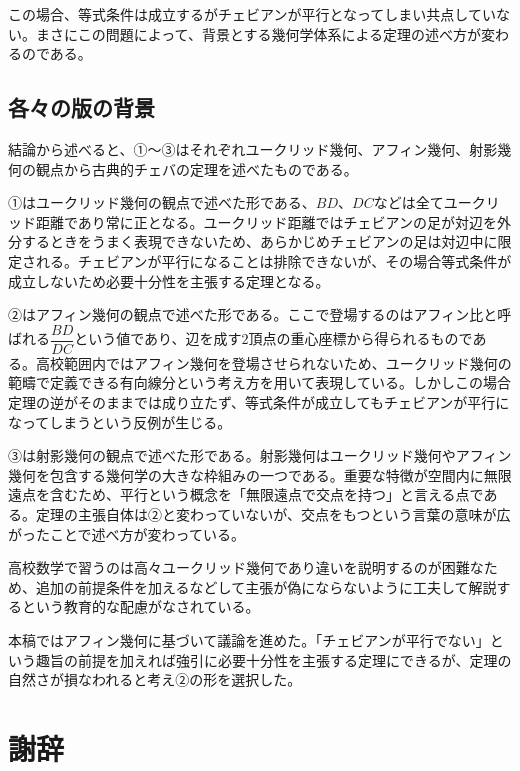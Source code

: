\documentclass[a4paper,12pt]{bxjsbook}
\newlength{\customindent}
\newenvironment{body}{
  \par
  \begingroup
  \setlength{\leftskip}{\customindent}
  \setlength{\rightskip}{0pt}
  \setlength{\parindent}{1em}
  \setlength{\displayindent}{\customindent}
  \setlength{\displaywidth}{\dimexpr\linewidth-\customindent\relax}
}{
  \par
  \endgroup
}
\theoremstyle{theorem}
\newcommand{\addchaptertotoc}[1]{%
  \chapter*{#1}%
  \addcontentsline{toc}{chapter}{#1}%
}
\begin{document}
    \begin{body}
        \indent この場合、等式条件は成立するがチェビアンが平行となってしまい共点していない。まさにこの問題によって、背景とする幾何学体系による定理の述べ方が変わるのである。
    \end{body}

    \section{各々の版の背景}

    \begin{body}
        \indent 結論から述べると、①〜③はそれぞれユークリッド幾何、アフィン幾何、射影幾何の観点から古典的チェバの定理を述べたものである。

        \indent ①はユークリッド幾何の観点で述べた形である、$BD$、$DC$などは全てユークリッド距離であり常に正となる。ユークリッド距離ではチェビアンの足が対辺を外分するときをうまく表現できないため、あらかじめチェビアンの足は対辺中に限定される。チェビアンが平行になることは排除できないが、その場合等式条件が成立しないため必要十分性を主張する定理となる。

        \indent ②はアフィン幾何の観点で述べた形である。ここで登場するのはアフィン比と呼ばれる$\dfrac{BD}{DC}$という値であり、辺を成す$2$頂点の重心座標から得られるものである。高校範囲内ではアフィン幾何を登場させられないため、ユークリッド幾何の範疇で定義できる有向線分という考え方を用いて表現している。しかしこの場合定理の逆がそのままでは成り立たず、等式条件が成立してもチェビアンが平行になってしまうという反例が生じる。

        \indent ③は射影幾何の観点で述べた形である。射影幾何はユークリッド幾何やアフィン幾何を包含する幾何学の大きな枠組みの一つである。重要な特徴が空間内に無限遠点を含むため、平行という概念を「無限遠点で交点を持つ」と言える点である。定理の主張自体は②と変わっていないが、交点をもつという言葉の意味が広がったことで述べ方が変わっている。

        \indent 高校数学で習うのは高々ユークリッド幾何であり違いを説明するのが困難なため、追加の前提条件を加えるなどして主張が偽にならないように工夫して解説するという教育的な配慮がなされている。

        \indent 本稿ではアフィン幾何に基づいて議論を進めた。「チェビアンが平行でない」という趣旨の前提を加えれば強引に必要十分性を主張する定理にできるが、定理の自然さが損なわれると考え②の形を選択した。
    \end{body}

    \backmatter
    \addchaptertotoc{謝辞}
    \begin{body}
    \end{body}
\end{document}
